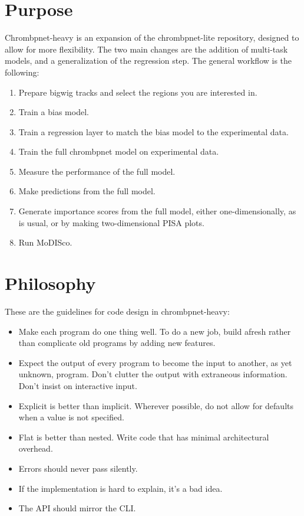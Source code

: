 \documentclass{article}
\begin{document}
\section{Purpose}
Chrombpnet-heavy is an expansion of the chrombpnet-lite repository, designed to allow for more flexibility. 
The two main changes are the addition of multi-task models, and a generalization of the regression step. 
The general workflow is the following:

\begin{enumerate}
    \item Prepare bigwig tracks and select the regions you are interested in. 
    \item Train a bias model. 
    \item Train a regression layer to match the bias model to the experimental data. 
    \item Train the full chrombpnet model on experimental data. 
    \item Measure the performance of the full model. 
    \item Make predictions from the full model. 
    \item Generate importance scores from the full model, either one-dimensionally, as is usual, or by making two-dimensional PISA plots. 
    \item Run MoDISco. 
\end{enumerate}

\section{Philosophy}
These are the guidelines for code design in chrombpnet-heavy:

\begin{itemize}
    \item Make each program do one thing well. To do a new job, build afresh rather than complicate old programs by adding new features.
    \item Expect the output of every program to become the input to another, as yet unknown, program. Don't clutter the output with extraneous information. Don't insist on interactive input. 
    \item Explicit is better than implicit. Wherever possible, do not allow for defaults when a value is not specified. 
    \item Flat is better than nested. Write code that has minimal architectural overhead. 
    \item Errors should never pass silently.
    \item If the implementation is hard to explain, it's a bad idea.
    \item The API should mirror the CLI. 
\end{itemize}
\end{document}
